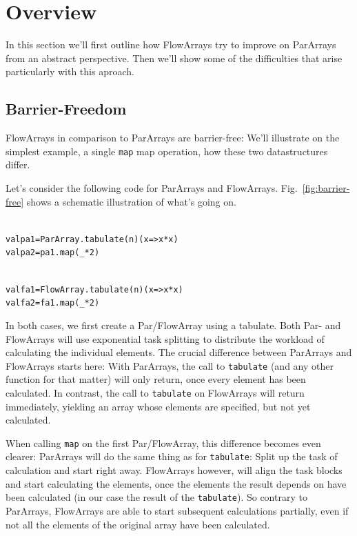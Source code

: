 \documentclass[runningheads,a4paper,fleqn]{llncs}
\begin{document}
\section{Overview}
\label{sec:overview}

In this section we'll first outline how FlowArrays try to improve on
ParArrays from an abstract perspective. Then we'll show some of the
difficulties that arise particularly with this aproach.

\subsection{Barrier-Freedom}
FlowArrays in comparison to ParArrays are barrier-free: We'll
illustrate on the simplest example, a single \texttt{map} map
operation, how these two datastructures differ.

Let's consider the following code for ParArrays and
FlowArrays. Fig.~\ref{fig:barrier-free} shows a schematic
illustration of what's going on.

\noindent
\begin{minipage}[t]{.5\textwidth}
\begin{alltt}
{\scriptsize
val pa1 = ParArray.tabulate(n)(x => x*x)
val pa2 = pa1.map(_ * 2)
}
\end{alltt}
\end{minipage}
\begin{minipage}[t]{.5\textwidth}
\begin{alltt}
{\scriptsize
val fa1 = FlowArray.tabulate(n)(x => x*x)
val fa2 = fa1.map(_ * 2)
}
\end{alltt}
\end{minipage}

In both cases, we first create a Par/FlowArray using a tabulate. Both
Par- and FlowArrays will use exponential task splitting
\cite{collect11,cong08} to distribute the workload of calculating the
individual elements. The crucial difference between ParArrays and
FlowArrays starts here: With ParArrays, the call to \texttt{tabulate}
(and any other function for that matter) will only return, once every
element has been calculated. In contrast, the call to
\texttt{tabulate} on FlowArrays will return immediately, yielding an
array whose elements are specified, but not yet calculated.

When calling \texttt{map} on the first Par/FlowArray, this difference
becomes even clearer: ParArrays will do the same thing as for
\texttt{tabulate}: Split up the task of calculation and start right
away. FlowArrays however, will align the task blocks and start
calculating the elements, once the elements the result depends on have
been calculated (in our case the result of the \texttt{tabulate}). So
contrary to ParArrays, FlowArrays are able to start subsequent
calculations partially, even if not all the elements of the original
array have been calculated.
\end{document}
